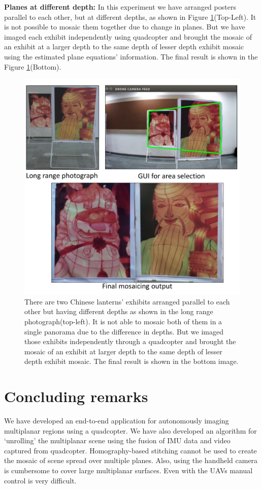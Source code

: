 \textbf{Planes at different depth:} In this experiment we have arranged posters
parallel to each other, but at different depths, as shown in Figure
\ref{fig:resultFrontBack}(Top-Left). It is not possible to mosaic them together
due to change in planes. But we have imaged each exhibit independently using
quadcopter and brought the mosaic of an exhibit at a larger depth to the same depth
of lesser depth exhibit mosaic using the estimated plane equations' information.
The final result is shown in the Figure \ref{fig:resultFrontBack}(Bottom).
\begin{figure}
\centering
\includegraphics[width=\linewidth]{figures/multiplanar/frontback.pdf}
\caption[Result: Imaging at different depths]{There are two Chinese lanterns'
exhibits arranged parallel to each other but having different depths as shown in the long range
photograph(top-left). It is not able to mosaic both of them in a single
panorama due to the difference in depths. But we imaged those exhibits
independently through a quadcopter and brought the mosaic of an exhibit at larger
depth to the same depth of lesser depth exhibit mosaic. The final result is
shown in the bottom image.}
\label{fig:resultFrontBack}
\end{figure}

\section{Concluding remarks}
We have developed an end-to-end application for autonomously imaging multiplanar
regions using a quadcopter. We have also developed an algorithm for `unrolling'
the multiplanar scene using the fusion of IMU data and video captured from
quadcopter. Homography-based stitching cannot be used to create the mosaic of
scene spread over multiple planes. Also, using the handheld camera is cumbersome
to cover large multiplanar surfaces. Even with the UAVs manual control is very difficult.

